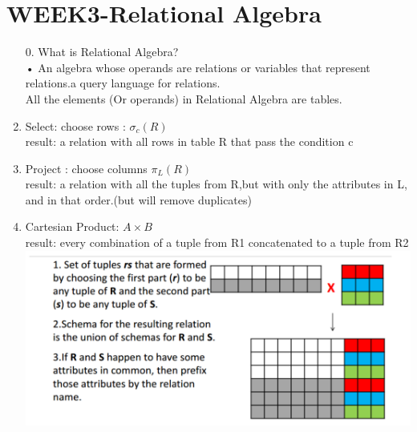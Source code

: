 \pagebreak
\section{WEEK3-Relational Algebra}
\begin{enumerate}
    \item[0.] What is Relational Algebra?\\
• An algebra whose operands are relations or variables
that represent relations.a query
language for relations.\\
All the elements (Or operands) in Relational Algebra are tables.
    \item Select: choose rows : $\sigma _{c}(R)$\\
    result: a relation with all rows in table R that pass the condition c
    \item Project : choose columns $\pi _{L}(R)$\\
    result: a relation with all the tuples from R,but with only the attributes in L, and in that order.(but will remove duplicates)
    \item Cartesian Product: $A\times B$\\
    result: every combination of a tuple from R1 concatenated to a
tuple from R2\\\includegraphics[scale=0.2]{Lec3/cartian.png}


\end{enumerate}
